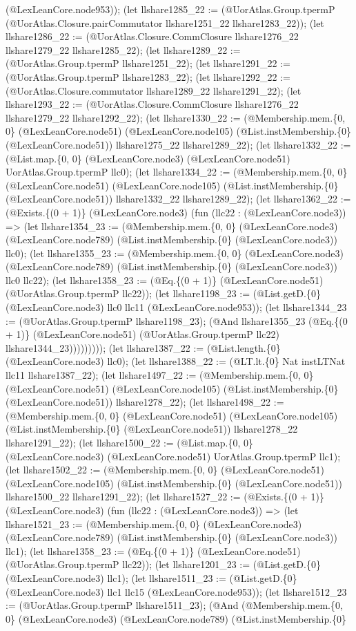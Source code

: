 \documentclass[11pt]{article}
\begin{document}
(@LexLeanCore.node953)); (let llshare1285\_22 := (@UorAtlas.Group.tpermP (@UorAtlas.Closure.pairCommutator llshare1251\_22 llshare1283\_22)); (let llshare1286\_22 := (@UorAtlas.Closure.CommClosure llshare1276\_22 llshare1279\_22 llshare1285\_22); (let llshare1289\_22 := (@UorAtlas.Group.tpermP llshare1251\_22); (let llshare1291\_22 := (@UorAtlas.Group.tpermP llshare1283\_22); (let llshare1292\_22 := (@UorAtlas.Closure.commutator llshare1289\_22 llshare1291\_22); (let llshare1293\_22 := (@UorAtlas.Closure.CommClosure llshare1276\_22 llshare1279\_22 llshare1292\_22); (let llshare1330\_22 := (@Membership.mem.\{0, 0\} (@LexLeanCore.node51) (@LexLeanCore.node105) (@List.instMembership.\{0\} (@LexLeanCore.node51)) llshare1275\_22 llshare1289\_22); (let llshare1332\_22 := (@List.map.\{0, 0\} (@LexLeanCore.node3) (@LexLeanCore.node51) UorAtlas.Group.tpermP llc0); (let llshare1334\_22 := (@Membership.mem.\{0, 0\} (@LexLeanCore.node51) (@LexLeanCore.node105) (@List.instMembership.\{0\} (@LexLeanCore.node51)) llshare1332\_22 llshare1289\_22); (let llshare1362\_22 := (@Exists.\{(0 + 1)\} (@LexLeanCore.node3) (fun (llc22 : (@LexLeanCore.node3)) => (let llshare1354\_23 := (@Membership.mem.\{0, 0\} (@LexLeanCore.node3) (@LexLeanCore.node789) (@List.instMembership.\{0\} (@LexLeanCore.node3)) llc0); (let llshare1355\_23 := (@Membership.mem.\{0, 0\} (@LexLeanCore.node3) (@LexLeanCore.node789) (@List.instMembership.\{0\} (@LexLeanCore.node3)) llc0 llc22); (let llshare1358\_23 := (@Eq.\{(0 + 1)\} (@LexLeanCore.node51) (@UorAtlas.Group.tpermP llc22)); (let llshare1198\_23 := (@List.getD.\{0\} (@LexLeanCore.node3) llc0 llc11 (@LexLeanCore.node953)); (let llshare1344\_23 := (@UorAtlas.Group.tpermP llshare1198\_23); (@And llshare1355\_23 (@Eq.\{(0 + 1)\} (@LexLeanCore.node51) (@UorAtlas.Group.tpermP llc22) llshare1344\_23))))))))); (let llshare1387\_22 := (@List.length.\{0\} (@LexLeanCore.node3) llc0); (let llshare1388\_22 := (@LT.lt.\{0\} Nat instLTNat llc11 llshare1387\_22); (let llshare1497\_22 := (@Membership.mem.\{0, 0\} (@LexLeanCore.node51) (@LexLeanCore.node105) (@List.instMembership.\{0\} (@LexLeanCore.node51)) llshare1278\_22); (let llshare1498\_22 := (@Membership.mem.\{0, 0\} (@LexLeanCore.node51) (@LexLeanCore.node105) (@List.instMembership.\{0\} (@LexLeanCore.node51)) llshare1278\_22 llshare1291\_22); (let llshare1500\_22 := (@List.map.\{0, 0\} (@LexLeanCore.node3) (@LexLeanCore.node51) UorAtlas.Group.tpermP llc1); (let llshare1502\_22 := (@Membership.mem.\{0, 0\} (@LexLeanCore.node51) (@LexLeanCore.node105) (@List.instMembership.\{0\} (@LexLeanCore.node51)) llshare1500\_22 llshare1291\_22); (let llshare1527\_22 := (@Exists.\{(0 + 1)\} (@LexLeanCore.node3) (fun (llc22 : (@LexLeanCore.node3)) => (let llshare1521\_23 := (@Membership.mem.\{0, 0\} (@LexLeanCore.node3) (@LexLeanCore.node789) (@List.instMembership.\{0\} (@LexLeanCore.node3)) llc1); (let llshare1358\_23 := (@Eq.\{(0 + 1)\} (@LexLeanCore.node51) (@UorAtlas.Group.tpermP llc22)); (let llshare1201\_23 := (@List.getD.\{0\} (@LexLeanCore.node3) llc1); (let llshare1511\_23 := (@List.getD.\{0\} (@LexLeanCore.node3) llc1 llc15 (@LexLeanCore.node953)); (let llshare1512\_23 := (@UorAtlas.Group.tpermP llshare1511\_23); (@And (@Membership.mem.\{0, 0\} (@LexLeanCore.node3) (@LexLeanCore.node789) (@List.instMembership.\{0\} 
\end{document}
